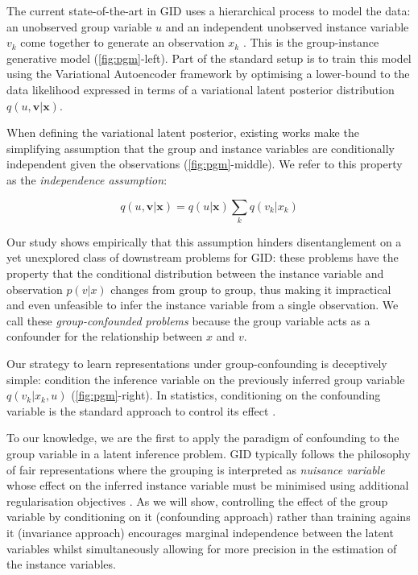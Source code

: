 \documentclass[nohyperref]{article}
\theoremstyle{plain}
\theoremstyle{definition}
\theoremstyle{remark}
\begin{document}
The current state-of-the-art in GID uses a hierarchical process to model the data: an unobserved group variable $u$ and an independent unobserved instance variable $v_k$ come together to generate an observation $x_k$ \citep{Bouchacourt2018MultiLevelVA, Hosoya2019GroupbasedLO, Nmeth2020AdversarialDW}. This is the group-instance generative model (\cref{fig:pgm}-left). Part of the standard setup is to train this model using the Variational Autoencoder framework \citep{Kingma2014AutoEncodingVB, JimenezRezende2014StochasticBA} by optimising a lower-bound to the data likelihood expressed in terms of a variational latent posterior distribution $q(u, \mathbf{v} | \mathbf{x})$. 

When defining the variational latent posterior,  existing works \citep{Bouchacourt2018MultiLevelVA, Hosoya2019GroupbasedLO, Nmeth2020AdversarialDW, Chen2020WeaklySD} make the simplifying assumption that the group and instance variables are conditionally independent given the observations (\cref{fig:pgm}-middle).  We refer to this property as the \textit{independence assumption}:

\begin{equation}
\label{eq:indep}
q(u, \mathbf{v} | \mathbf{x}) = q(u | \mathbf{x}) \sum_k q(v_k | x_k)
\end{equation}

Our study shows empirically that this assumption hinders disentanglement on a yet unexplored class of downstream problems for GID: these problems have the property that the conditional distribution between the instance variable and observation $p(v | x)$ changes from group to group, thus making it impractical and even unfeasible to infer the instance variable from a single observation. We call these \textit{group-confounded problems} because the group variable acts as a confounder for the relationship between $x$ and $v$.

Our strategy to learn representations under group-confounding is deceptively simple: condition the inference variable on the previously inferred group variable $q(v_k | x_k, u)$ (\cref{fig:pgm}-right). In statistics, conditioning on the confounding variable is the standard approach to control its effect \citep{Greenland1999ConfoundingAC}.

To our knowledge, we are the first to apply the paradigm of confounding to the group variable in a latent inference problem. GID typically follows the philosophy of fair representations \citep{Louizos2016TheVF, Achille2018EmergenceOI} where the grouping is interpreted as \textit{nuisance variable} whose effect on the inferred instance variable must be minimised using additional regularisation objectives \citep{Nmeth2020AdversarialDW}. As we will show, controlling the effect of the group variable by conditioning on it (confounding approach) rather than training agains it (invariance approach) encourages marginal independence between the latent variables whilst simultaneously allowing for more precision in the estimation of the instance variables.
\end{document}
